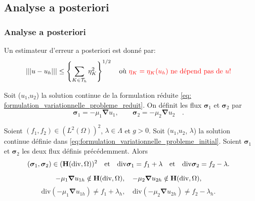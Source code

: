 \documentclass{beamer}
\renewcommand{\div}{\mathrm{div}}
\begin{document}
\subsection{Analyse a posteriori}
\begin{frame}
\frametitle{Analyse a posteriori}
Un estimateur d'erreur a posteriori est donné par:
\begin{equation*}
|||u-u_h||| \leq \left\{\displaystyle\sum_{\substack{K \in\mathcal{T}_h}}\eta_K^2\right\}^{1/2} \quad \mbox{où \textcolor{red}{$\eta_K=\eta_K(u_h)$ ne dépend pas de $u$!}}
\end{equation*}
\begin{definition}
Soit ($u_1$,$u_2$) la solution continue de la formulation réduite \eqref{eq: formulation_variationnelle_probleme_reduit}. On définit les flux ${\bm{\sigma}}_1$ et ${\bm{\sigma}}_2$ par
\begin{equation}
{\bm{\sigma}}_1=-\mu_1 {\bm \nabla} u_1, \qquad {\bm{\sigma}}_2=-\mu_2{\bm \nabla} u_2 \quad.
\end{equation}
\end{definition}
\end{frame}
\begin{frame}
\begin{proposition}
\label{ref: proposition_5}
Soient $(f_1,f_2)\in (L^2(\Omega))^2$, $\lambda\in \Lambda$ et $g>0$. Soit ($u_1$,$ u_2$, $\lambda$) la solution continue définie dans  \eqref{eq:formulation_variationnelle_probleme_initial}.  Soient ${\bm{\sigma}}_1$ et ${\bm{\sigma}}_2$ les deux flux définis précédemment.
Alors 
\begin{equation}
({\bm{\sigma}}_1,{\bm{\sigma}}_2) \in (\textbf H(\div,\Omega))^2 \quad \mbox{et} \quad  \div {\bm{\sigma}}_1=f_1+\lambda \quad \mbox{et} \quad \div{\bm{\sigma}}_2=f_2-\lambda.
\end{equation}
\end{proposition}
\begin{remarque}
\begin{equation}
\nonumber -\mu_1{\bm{\nabla}} u_{1h} \notin  \textbf H(\div,\Omega), \quad -\mu_2{\bm{\nabla}} u_{2h} \notin \textbf H(\div,\Omega),
\end{equation}
\begin{equation}
\nonumber \div(-\mu_1{\bm{\nabla}} u_{1h}) \neq  f_1+\lambda_h,\quad
\div(-\mu_2{\bm{\nabla}} u_{2h}) \neq f_2-\lambda_h.
\end{equation}
\end{remarque}

\end{frame}
\end{document}
